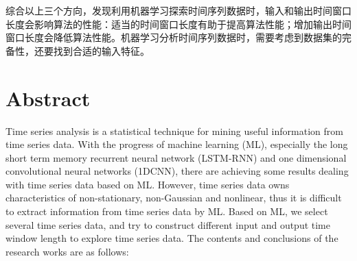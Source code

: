 \begin{enumerate}
  综合以上三个方向，发现利用机器学习探索时间序列数据时，输入和输出时间窗口长度会影响算法的性能：适当的时间窗口长度有助于提高算法性能；增加输出时间窗口长度会降低算法性能。机器学习分析时间序列数据时，需要考虑到数据集的完备性，还要找到合适的输入特征。

\end{enumerate}


\intobmk\chapter*{Abstract}
Time series analysis is a statistical technique for mining useful information from time series data. With the progress of machine learning (ML), especially the long short term memory recurrent neural network (LSTM-RNN) and one dimensional convolutional neural networks (1DCNN), there are achieving some results dealing with time series data based on ML. However, time series data owns characteristics of non-stationary, non-Gaussian and nonlinear, thus it is difficult to extract information from time series data by ML. Based on ML, we select several time series data, and try to construct different input and output time window length to explore time series data. The contents and conclusions of the research works are as follows:

